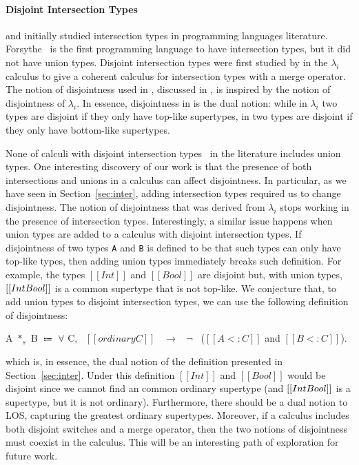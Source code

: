 \paragraph{Disjoint Intersection Types}
\citet{pottinger1980type} and \citet{coppo1981functional} initially
studied intersection types in programming languages
literature. Forsythe~\cite{reynolds1988preliminary} is the first 
programming language to have intersection types, but it did not
have union types.  Disjoint intersection types were first
studied by \citet{oliveira2016disjoint} in the $\lambda_{i}$ calculus
to give a coherent calculus for intersection types with a merge
operator. The notion of disjointness used in \cal, discussed in ,
is inspired by the notion of disjointness of $\lambda_{i}$. In essence,
disjointness in \cal is the dual notion: while in $\lambda_{i}$ two types
are disjoint if they only have top-like supertypes, in \cal two types
are disjoint if they only have bottom-like supertypes.

None of calculi with disjoint intersection types~\cite{oliveira2016disjoint,bi_et_al:LIPIcs:2018:9227,alpuimdisjoint} in the literature
includes union types. One interesting discovery of our work is that the
presence of both intersections and unions in a calculus can affect disjointness.
In particular, as we have seen in Section~\ref{sec:inter}, adding intersection types
required us to change disjointness. The notion of disjointness that was
derived from $\lambda_{i}$ stops working in the presence of intersection types.
Interestingly, a similar issue happens when union types are added to
a calculus with disjoint intersection types. If disjointness of two types \lstinline{A}
and \lstinline{B} is defined to be that such types can only have top-like types,
then adding union types immediately breaks such definition.
For example, the types $[[Int]]$ and $[[Bool]]$ are disjoint but, with union
types, $[[Int \/ Bool]]$ is a common supertype that is not top-like.
We conjecture that, to add union types to disjoint intersection types,
we can use the following definition of disjointness:

\begin{definition}
\label{def:related:disj}
  A $*_s$ B $\Coloneqq$ $\forall$ C, \ $[[ordinary C]]$ \ $\rightarrow$ \ $\neg$ \ ($[[A <: C]]$ and $[[B <: C]]$).
\end{definition}

\noindent which is, in essence, the dual notion of the definition presented in
Section~\ref{sec:inter}. Under this definition $[[Int]]$ and $[[Bool]]$ would
be disjoint since we cannot find an common ordinary supertype (and $[[Int \/ Bool]]$
is a supertype, but it is not ordinary). Furthermore, there should be a
dual notion to LOS, capturing the greatest ordinary supertypes. Moreover,
if a calculus includes both disjoint switches and a merge operator,
then the two notions of disjointness must coexist in the calculus. 
This will be an interesting path of exploration for future work.


